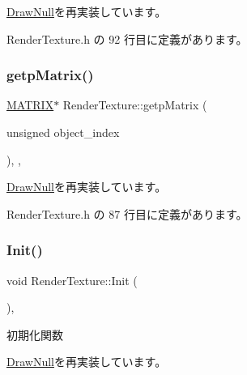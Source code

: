 \mbox{\hyperlink{class_draw_null_aa07d7e89e723b68ec257da0f63d43f70}{Draw\+Null}}を再実装しています。



 Render\+Texture.\+h の 92 行目に定義があります。

\mbox{\label{class_render_texture_adafb7e9aeea3c298cbfcc71e35ed9457}} 
\subsubsection{\texorpdfstring{getp\+Matrix()}{getpMatrix()}}
{\footnotesize\ttfamily \mbox{\hyperlink{_vector3_d_8h_a032295cd9fb1b711757c90667278e744}{M\+A\+T\+R\+IX}}$\ast$ Render\+Texture\+::getp\+Matrix (\begin{DoxyParamCaption}\item[{unsigned}]{object\+\_\+index }\end{DoxyParamCaption})\hspace{0.3cm}{\ttfamily [inline]}, {\ttfamily [override]}, {\ttfamily [virtual]}}



\mbox{\hyperlink{class_draw_null_a001901c340671106a33d44b9d4aef4c4}{Draw\+Null}}を再実装しています。



 Render\+Texture.\+h の 87 行目に定義があります。

\mbox{\label{class_render_texture_a498eb8be8672e01164b3770cdff43291}} 
\subsubsection{\texorpdfstring{Init()}{Init()}}
{\footnotesize\ttfamily void Render\+Texture\+::\+Init (\begin{DoxyParamCaption}{ }\end{DoxyParamCaption})\hspace{0.3cm}{\ttfamily [inline]}, {\ttfamily [virtual]}}



初期化関数 



\mbox{\hyperlink{class_draw_null_acd7fef3ccea1da537ac9507ffbb6dd2e}{Draw\+Null}}を再実装しています。



